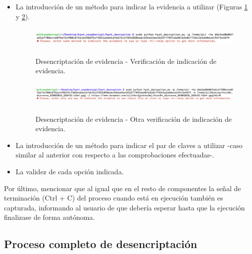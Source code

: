 \documentclass[12pt,a4paper, twoside]{report}
\begin{document}
\begin{enumerate}
\begin{itemize}
	 		\item La introducción de un método para indicar la evidencia a utilizar (Figuras \ref{fig:userguide_evidence_method} y \ref{fig:userguide_evidence_onemethod}).
	 		
	 		\begin{figure}[!ht]   
				\caption{Desencriptación de evidencia - Verificación de indicación de evidencia.} 
				\begin{center} 
					\includegraphics[width=18.5cm,height=1cm]{Images/userGuide/evidence/evidence_method} \\
					\label{fig:userguide_evidence_method} 
				\end{center}  
			\end{figure}
						
			\begin{figure}[!ht]   
				\caption{Desencriptación de evidencia - Otra verificación de indicación de evidencia.} 
				\begin{center} 
					\includegraphics[width=18.5cm,height=1.2cm]{Images/userGuide/evidence/evidence_onemethod} \\
					\label{fig:userguide_evidence_onemethod} 
				\end{center}  
			\end{figure}
	 		
	 		\item La introducción de un método para indicar el par de claves a utilizar -caso similar al anterior con respecto a las comprobaciones efectuadas-.
	 		\item La validez de cada opción indicada.
	 	\end{itemize}
	 	
	 \end{enumerate}

	Por último, mencionar que al igual que en el resto de componentes la señal de terminación (Ctrl + C) del proceso cuando está en ejecución también es capturada, informando al usuario de que debería esperar hasta que la ejecución finalizase de forma autónoma.

	 \subsection{Proceso completo de desencriptación}
\end{document}
